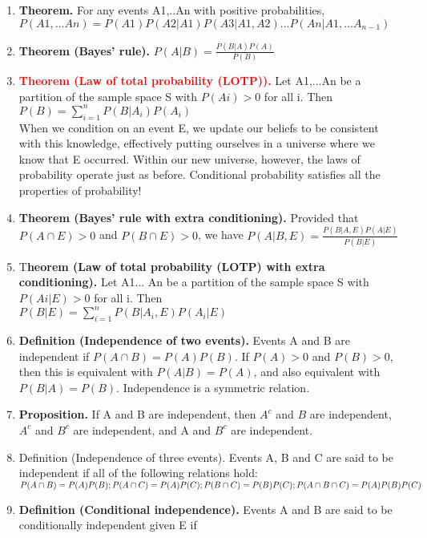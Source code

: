 \documentclass[11pt]{article}
\begin{document}
\begin{enumerate}
\begin{enumerate}
	\item \textbf{Theorem.} For any events A1,..An with positive probabilities,\\
	$P(A1,...An) = P(A1)P(A2|A1)P(A3|A1,A2)...P(An|A1,...A_{n-1})$
	\item\textbf{ Theorem (Bayes’ rule).}
	$P(A|B) = \frac{P(B|A)P(A)}{P(B)}$
	\item \textcolor{red}{\textbf{Theorem (Law of total probability (LOTP)).}} Let A1,...An be a partition of the sample space S with
	$P(Ai) > 0$ for all i. Then\\
	$P(B) = \sum_{i=1}^{n}P(B|A_i)P(A_i)$\\
	When we condition on an event E, we update our beliefs
	to be consistent with this knowledge, effectively putting ourselves in a universe where we know that E
	occurred. Within our new universe, however, the laws of probability operate just as before. Conditional
	probability satisfies all the properties of probability!
	\item\textbf{ Theorem (Bayes’ rule with extra conditioning). }Provided that $P(A\cap E) > 0$ and $P(B \cap E) > 0$, we have
	$P(A | B, E) =
	\frac{P(B | A, E)P(A | E)}
	{P(B | E)}$
	\item T\textbf{heorem (Law of total probability (LOTP) with extra conditioning).} Let A1... An be a partition of the
	sample space S with $P(Ai | E) > 0$ for all i. Then \\
	$P(B|E) = \sum_{i=1}^{n}P(B|A_i,E)P(A_i|E)$
	\item\textbf{ Definition (Independence of two events).} Events A and B are independent if $P(A \cap B) = P(A)P(B)$. If
	$P(A) > 0$ and $P(B) > 0$, then this is equivalent with $P(A | B) = P(A)$, and also equivalent with $P(B | A) =
	P(B)$. Independence is a symmetric relation.
	\item \textbf{Proposition.} If A and B are independent, then $A^c$ and $B$ are independent, $A^c$ and $B^c$ are independent, and
	A and $B^c$ are independent.
	\item Definition (Independence of three events). Events A, B and C are said to be independent if all of the
	following relations hold:\\
	$P(A \cap B) = P(A)P(B);\\
	P(A \cap C) = P(A)P(C);\\
	P(B \cap C) = P(B)P(C);\\
	P(A \cap B \cap C) = P(A)P(B)P(C)$
	\item \textbf{Definition (Conditional independence).} Events A and B are said to be conditionally independent given E if

\end{enumerate}
\end{enumerate}
\end{document}
